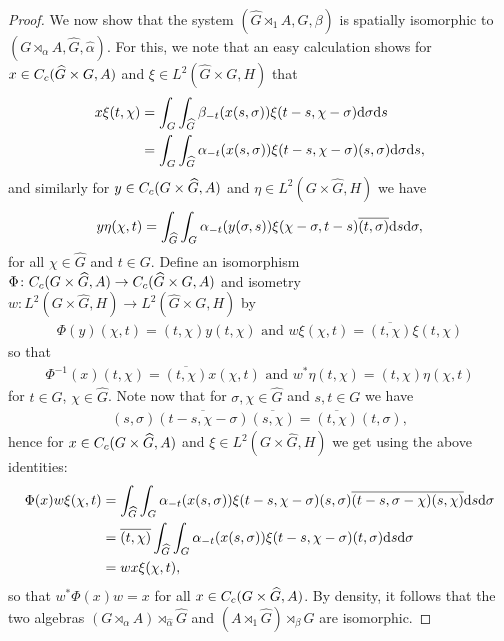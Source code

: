 \begin{proof}
We now show that the system $(\hat G \rtimes_1  A , G, \beta)$ is spatially isomorphic to $(G \rtimes_\alpha A, \hat G, \hat \alpha)$. For this, we note that an easy calculation shows for $x \in C_c(\widehat{G} \times G, A)$ and $\xi \in L^2(\hat G \times G, H)$ that
\begin{align*}
	x \xi(t, \chi) &= \int_G \int_{\widehat{G}} \beta_{-t}(x(s, \sigma))\xi(t-s,\chi-\sigma)\mathrm{d} \sigma \mathrm{d} s \\
&=\int_G \int_{\widehat{G}} \alpha_{-t}(x(s, \sigma)) \xi(t-s,\chi-\sigma)(s,\sigma)\mathrm{d} \sigma \mathrm{d} s,	
\end{align*}
and similarly for $y \in C_c(G \times \widehat{G}, A)$ and $\eta \in L^2(G \times \hat G, H)$ we have
\begin{align*}
y \eta(\chi,t) = \int_{\widehat{G}} \int_G \alpha_{-t}(y(\sigma,s)) \xi(\chi-\sigma, t-s) \overline{(t,\sigma)} \mathrm{d} s \mathrm{d} \sigma,
\end{align*}
for all $\chi \in \hat G$ and $t \in G$. Define an isomorphism $\Phi \colon C_c(G \times \widehat{G}, A) \to C_c(\widehat{G}\times G , A)$ and isometry $w \colon L^2(G \times \hat G, H) \to L^2(\hat G \times G, H)$ by
\begin{align*}
\Phi(y)(\chi,t) = (t,\chi) y(t,\chi) \text{ and } w \xi(\chi,t) = \overline{(t,\chi)} \xi(t,\chi)	
\end{align*}
so that
\begin{align*}
\Phi^{-1}(x)(t,\chi) = \overline{(t,\chi)} x(\chi,t) \text{ and } w^* \eta(t,\chi) = (t,\chi) \eta(\chi,t)	
\end{align*}
for $t \in G$, $\chi \in \hat G$. Note now that for $\sigma, \chi \in \hat G$ and $s,t \in G$ we have
\begin{align*}
(s,\sigma) \overline{(t-s,\chi- \sigma)}\overline{(s,\chi)} = \overline{(t,\chi)}(t,\sigma),
\end{align*}
hence for $x \in C_c(G \times \widehat{G}, A)$ and $\xi \in L^2(G \times \hat G,H)$ we get using the above identities:
\begin{align*}
\Phi(x) w \xi(\chi,t)&= \int_{\widehat{G}} \int_G \alpha_{-t}(x(s, \sigma)) \xi(t-s, \chi-\sigma)(s, \sigma) \overline{(t-s,\sigma-\chi)}\overline{(s,\chi)} \mathrm{d} s \mathrm{d} \sigma\\
&= \overline{(t,\chi)} \int_{\widehat{G}} \int_G \alpha_{-t}(x(s,\sigma)) \xi(t-s,\chi-\sigma)(t,\sigma) \mathrm{d} s \mathrm{d} \sigma\\
&= w x \xi(\chi,t),
\end{align*}
so that $w^* \Phi(x) w = x$ for all $x \in C_c(G \times \widehat{G}, A)$. By density, it follows that the two algebras $(G \rtimes_\alpha A) \rtimes_{\hat \alpha} \hat G $ and $(A \rtimes_{1} \hat G)\rtimes_{\beta} G$ are isomorphic.
\end{proof}
